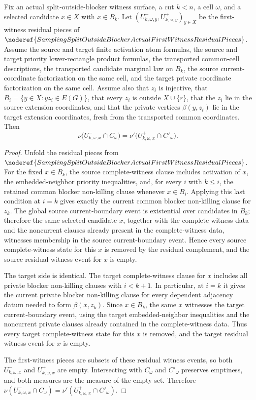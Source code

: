 \begin{helper}
Fix an actual split-outside-blocker witness surface, a cut \(k<n\), a cell
\(\omega\), and a selected candidate \(x\in X\) with \(x\in B_k\).  Let
\((U^-_{k,\omega,y},U^+_{k,\omega,y})_{y\in X}\) be the first-witness
residual pieces of
\(\noderef{SamplingSplitOutsideBlockerActualFirstWitnessResidualPieces}\).
Assume the source and target finite activation atom formulas, the source and
target priority lower-rectangle product formulas, the transported common-cell
descriptions, the transported candidate marginal law on \(B_k\), the source
current-coordinate factorization on the same cell, and the target private
coordinate factorization on the same cell.  Assume also that \(z_i\) is
injective, that \(B_i=\{y\in X:yz_i\in E(G)\}\), that every \(z_i\) is outside
\(X\cup\{r\}\), that the \(z_i\) lie in the source extension coordinates, and
that the private vertices \(\beta(y,z_i)\) lie in the target extension
coordinates, fresh from the transported common coordinates.  Then
\[
  \nu\bigl(U^-_{k,\omega,x}\cap C_\omega\bigr)
  =
  \nu'\bigl(U^+_{k,\omega,x}\cap C'_\omega\bigr).
\]
\end{helper}
\begin{proof}
Unfold the residual pieces from
\(\noderef{SamplingSplitOutsideBlockerActualFirstWitnessResidualPieces}\).
For the fixed \(x\in B_k\), the source complete-witness clause includes
activation of \(x\), the embedded-neighbor priority inequalities, and, for
every \(i\) with \(k\le i\), the retained common blocker non-killing clause
whenever \(x\in B_i\).  Applying this last condition at \(i=k\) gives exactly
the current common blocker non-killing clause for \(z_k\).  The global source
current-boundary event is existential over candidates in \(B_k\); therefore
the same selected candidate \(x\), together with the complete-witness data
and the noncurrent clauses already present in the complete-witness data,
witnesses membership in the source current-boundary event.  Hence every
source complete-witness state for this \(x\) is removed by the residual
complement, and the source residual witness event for \(x\) is empty.

The target side is identical.  The target complete-witness clause for \(x\)
includes all private blocker non-killing clauses with \(i<k+1\).  In
particular, at \(i=k\) it gives the current private blocker non-killing
clause for every dependent adjacency datum needed to form
\(\beta(x,z_k)\).  Since \(x\in B_k\), the same \(x\) witnesses the target
current-boundary event, using the target embedded-neighbor inequalities and
the noncurrent private clauses already contained in the complete-witness
data.  Thus every target complete-witness state for this \(x\) is removed,
and the target residual witness event for \(x\) is empty.

The first-witness pieces are subsets of these residual witness events, so
both \(U^-_{k,\omega,x}\) and \(U^+_{k,\omega,x}\) are empty.  Intersecting
with \(C_\omega\) and \(C'_\omega\) preserves emptiness, and both measures
are the measure of the empty set.  Therefore
\(\nu(U^-_{k,\omega,x}\cap C_\omega)
=\nu'(U^+_{k,\omega,x}\cap C'_\omega)\).
\end{proof}
